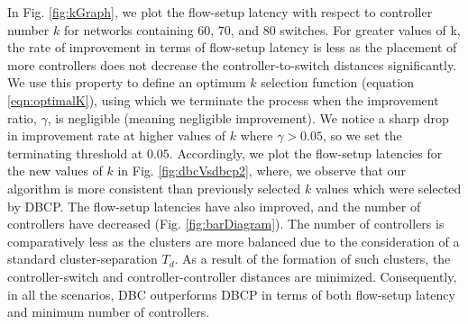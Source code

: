 \documentclass{IEEEtran}
\begin{document}
	In Fig. \ref{fig:kGraph}, we plot the flow-setup latency with respect to controller number $k$ for networks containing 60, 70, and 80 switches. For greater values of k, the rate of improvement in terms of flow-setup latency is less as the placement of more controllers does not decrease the controller-to-switch distances significantly. We use this property to define an optimum $k$ selection function (equation \ref{eqn:optimalK}), using which we terminate the process when the improvement ratio, $\gamma$, is negligible (meaning negligible improvement). We notice a sharp drop in improvement rate at higher values of $k$ where $\gamma > 0.05$, so we set the terminating threshold at $0.05$. Accordingly, we plot the flow-setup latencies for the new values of $k$ in Fig. \ref{fig:dbcVsdbcp2}, where, we observe that our algorithm is more consistent than previously selected $k$ values which were selected by DBCP. The flow-setup latencies have also improved, and the number of controllers have decreased (Fig. \ref{fig:barDiagram}). The number of controllers is comparatively less as the clusters are more balanced due to the consideration of a standard cluster-separation $T_d$. As a result of the formation of such clusters, the controller-switch and controller-controller distances are minimized. Consequently, in all the scenarios, DBC outperforms DBCP in terms of both flow-setup latency and minimum number of controllers.
	
\end{document}
